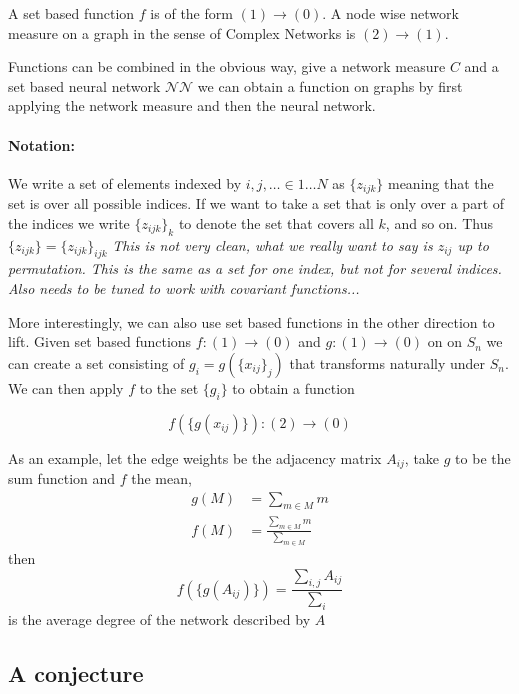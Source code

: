\documentclass[reprint,twocolumn,amsmath,amssymb,aps]{revtex4-1}
\newcommand{\NN}{\mathcal{NN}}
\begin{document}
A set based function $f$ is of the form $(1) \rightarrow (0)$. A node wise network measure on a graph in the sense of Complex Networks is $(2) \rightarrow (1)$.

Functions can be combined in the obvious way, give a network measure $C$ and a set based neural network $\NN$ we can obtain a function on graphs by first applying the network measure and then the neural network.

\paragraph*{Notation:} We write a set of elements indexed by $i,j,\dots \in 1 \dots N$ as $\{z_{ijk}\}$ meaning that the set is over all possible indices. If we want to take a set that is only over a part of the indices we write $\{z_{ijk}\}_k$ to denote the set that covers all $k$, and so on. Thus $\{z_{ijk}\} = \{z_{ijk}\}_{ijk}$ \textit{This is not very clean, what we really want to say is $z_{ij}$ up to permutation. This is the same as a set for one index, but not for several indices. Also needs to be tuned to work with covariant functions...}

More interestingly, we can also use set based functions in the other direction to lift. Given set based functions $f: (1) \rightarrow (0)$  and $g: (1) \rightarrow (0)$ on  on $S_{n}$ we can create a set consisting of $g_i = g(\{x_{ij}\}_{j})$ that transforms naturally under $S_n$. We can then apply $f$ to the set $\{g_i\}$ to obtain a function

\begin{equation} \label{eq::2 to 0 structure}
f(\{g(x_{ij})\}) : (2) \rightarrow (0)
\end{equation}

As an example, let the edge weights be the adjacency matrix $A_{ij}$, take $g$ to be the sum function and $f$ the mean,
\begin{align}
g(M) &= \sum_{m \in M} m\\
f(M) &= \frac{\sum_{m \in M} m}{\sum_{m \in M}}
\end{align}
then 
\begin{equation}
f(\{g(A_{ij})\}) = \frac{\sum_{i, j} A_{ij}}{\sum_{i}}
\end{equation}
is the average degree of the network described by $A$

\subsection{A conjecture}
\end{document}
